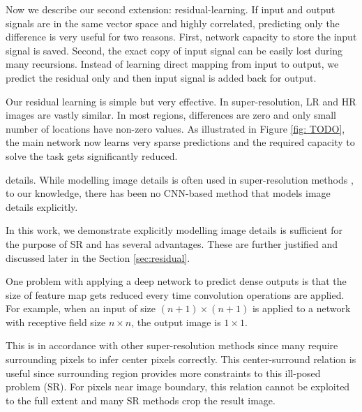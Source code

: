 \documentclass[10pt,twocolumn,letterpaper]{article}
\begin{document}
Now we describe our second extension: residual-learning. If input and output signals are in the same vector space and highly correlated, predicting only the difference is very useful for two reasons. First, network capacity to store the input signal is saved. Second, the exact copy of input signal can be easily lost during many recursions. Instead of learning direct mapping from input to output, we predict the residual only and then input signal is added back for output.

Our residual learning is simple but very effective. In super-resolution, LR and HR images are vastly similar. In most regions, differences are zero and only small number of locations have non-zero values. As illustrated in Figure \ref{fig: TODO}, the main network now learns very sparse predictions and the required capacity to solve the task gets significantly reduced. 

% 

 details. While modelling image details is often used in super-resolution methods \cite{Timofte2013, Timofte, bevilacqua2012,bevilacqua2013super}, to our knowledge, there has been no CNN-based method that models image details explicitly.

In this work, we demonstrate explicitly modelling image details is sufficient for the purpose of SR and has several advantages. These are further justified and discussed later in the Section \ref{sec:residual}. 

One problem with applying a deep network to predict dense outputs is that the size of feature map gets reduced every time convolution operations are applied. For example,  when an input of size $(n+1)\times (n+1)$ is applied to a network with receptive field size $n\times n$, the output image is $1\times1$. 

This is in accordance with other super-resolution methods since many require surrounding pixels to infer center pixels correctly. This center-surround relation is useful since surrounding region provides more constraints to this ill-posed problem (SR). For pixels near image boundary, this relation cannot be exploited to the full extent and many SR methods crop the result image. 
\end{document}
